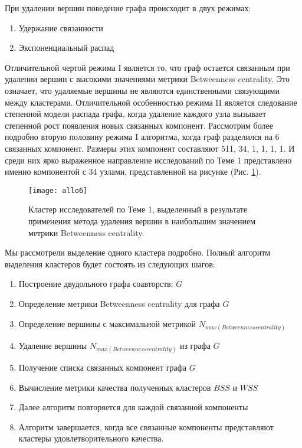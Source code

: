При удалении вершин поведение графа происходит в двух режимах:

\begin{enumerate}[I/]
\item Удержание связанности
\item Экспоненциальный распад
\end{enumerate}

Отличительной чертой режима I является то, что граф остается связанным при удалении вершин с высокими значениями метрики Betweenness centrality. Это означает, что удаляемые вершины не являются единственными связующими между кластерами.
Отличительной особенностью режима II является следование степенной модели распада графа, когда удаление каждого узла вызывает степенной рост появления новых связанных компонент.
Рассмотрим более подробно вторую половину режима I алгоритма, когда граф разделился на 6 связанных компонент. Размеры этих компонент составляют 511, 34, 1, 1, 1, 1. И среди них ярко выраженное направление исследований по Теме 1 представлено именно компонентой с 34 узлами, представленной на рисунке (Рис. \ref{fig:allo6}).

\begin{figure}[H]
  \caption{Кластер исследователей по Теме 1, выделенный в результате применения метода удаления вершин в наибольшим значением метрики Betweenness centrality.}
  \centering
    \texttt{[image: allo6]}
  \label{fig:allo6}
\end{figure}  

Мы рассмотрели выделение одного кластера подробно. Полный алгоритм выделения кластеров будет состоять из следующих шагов:
\begin{enumerate}
\tightlist
\item Построение двудольного графа соавторств: $G$
\item Определение метрики Betweenness centrality для графа $G$
\item Определение вершины с максимальной метрикой $N_{max(Betweenness centrality)}$
\item Удаление вершины $N_{max(Betweenness centrality)}$ из графа $G$
\item Получение списка связанных компонент графа $G$
\item Вычисление метрики качества полученных кластеров $BSS$ и $WSS$
\item Далее алгоритм повторяется для каждой связанной компоненты
\item Алгоритм завершается, когда все связанные компоненты представляют кластеры удовлетворительного качества.
\end{enumerate}

